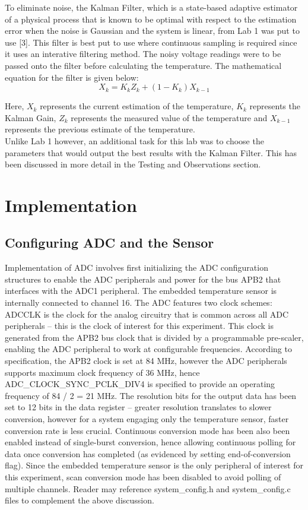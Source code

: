 \documentclass{article}
\begin{document}
\noindent To eliminate noise, the Kalman Filter, which is  a  state-based  adaptive  estimator  of  a  physical  process  that  is  known  to  be optimal with respect to the estimation error when the noise is Gaussian and the system is linear, from Lab 1 was put to use [3]. This filter is best put to use where continuous sampling is required since it uses an interative filtering method. The noisy voltage readings were to be passed onto the filter before calculating the temperature. The mathematical equation for the filter is given below: \\

\[ X_k = K_kZ_k + (1 - K_k) X_{k-1} \]

\noindent Here, $X_k$ represents the current estimation of the temperature, $K_k$ represents the Kalman Gain, $Z_k$ represents the measured value of the temperature and $X_{k-1}$ represents the previous estimate of the temperature. \\

\noindent Unlike Lab 1 however, an additional task for this lab was to choose the parameters that would output the best results with the Kalman Filter. This has been discussed in more detail in the Testing and Observations section. \\

\section{Implementation}
\subsection{Configuring ADC and the Sensor}

Implementation of ADC involves first initializing the ADC configuration structures to enable the ADC peripherals and power for the bus APB2 that interfaces with the ADC1 peripheral. The embedded temperature sensor is internally connected to channel 16. The ADC features two clock schemes: ADCCLK is the clock for the analog circuitry that is common across all ADC peripherals – this is the clock of interest for this experiment. This clock is generated from the APB2 bus clock that is divided by a programmable pre-scaler, enabling the ADC peripheral to work at configurable frequencies. According to specification, the APB2 clock is set at 84 MHz, however the ADC peripherals supports maximum clock frequency of 36 MHz, hence ADC\_CLOCK\_SYNC\_PCLK\_DIV4 is specified to provide an operating frequency of 84 / 2 = 21 MHz. The resolution bits for the output data has been set to 12 bits in the data register – greater resolution translates to slower conversion, however for a system engaging only the temperature sensor, faster conversion rate is less crucial. Continuous conversion mode has been also been enabled instead of single-burst conversion, hence allowing continuous polling for data once conversion has completed (as evidenced by setting end-of-conversion flag). Since the embedded temperature sensor is the only peripheral of interest for this experiment, scan conversion mode has been disabled to avoid polling of multiple channels. Reader may reference system\_config.h and system\_config.c files to complement the above discussion. 
\end{document}
